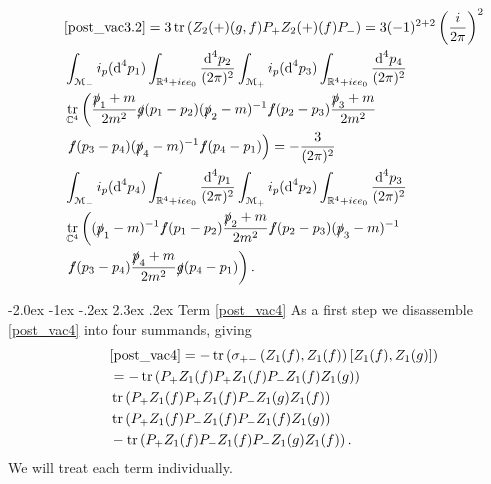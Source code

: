 \documentclass[oneside,reqno,12pt]{amsart}
\makeatletter
\DeclareMathOperator{\tr}{tr}
\renewcommand\section{\@startsection {section}{1}{\z@}%
                                   {-2.0ex \@plus -1ex \@minus -.2ex}%
                                   {2.3ex \@plus.2ex}%
                                   {\normalfont\Large\bfseries}}
\makeatother
\begin{document}
\begin{align*}
&\eqref{post_vac3.2}=3 \tr\left(Z_{2}(+)(g,f) P_+ Z_{2}(+)(f) P_-\right)
=3(-1)^{2+2}\left(\frac{i}{2\pi}\right)^2\\
&  \int_{\mathcal{M}_-}  i_p(\text{d}^4p_{1})
\int_{\mathbb{R}^4+i \epsilon e_0}\frac{\text{d}^4p_2}{(2\pi)^{2}} 
\int_{\mathcal{M}_+}  i_p(\text{d}^4p_{3})
\int_{\mathbb{R}^4+i\epsilon e_0}\frac{\text{d}^4p_4}{(2\pi)^{2}}\\\tag*{}
&\tr_{\mathbb{C}^4}\left(\frac{\slashed{p}_1+m}{2m^2}  \slashed{g}(p_{1}-p_2)  (\slashed{p}_2-m)^{-1}  
\slashed{f}(p_{2}-p_{3})
  \frac{\slashed{p}_{3}+m}{2m^2} \right.\\
&\left.\slashed{f}(p_{3}-p_4)  (\slashed{p}_4-m)^{-1}  
\slashed{f}(p_{4}-p_{1})\right)
=-\frac{3}{(2\pi)^2}\\
&  \int_{\mathcal{M}_-}  i_p(\text{d}^4p_{4})
\int_{\mathbb{R}^4+i \epsilon e_0}\frac{\text{d}^4p_1}{(2\pi)^{2}} 
\int_{\mathcal{M}_+}  i_p(\text{d}^4p_{2})
\int_{\mathbb{R}^4+i\epsilon e_0}\frac{\text{d}^4p_3}{(2\pi)^{2}}\\\tag*{}
&\tr_{\mathbb{C}^4}
\left( (\slashed{p}_1-m)^{-1}  \slashed{f}(p_{1}-p_{2})
  \frac{\slashed{p}_{2}+m}{2m^2} \slashed{f}(p_{2}-p_3)  (\slashed{p}_3-m)^{-1} \right.\\
&\left. \slashed{f}(p_{3}-p_{4})\frac{\slashed{p}_4+m}{2m^2}
 \slashed{g}(p_{4}-p_1)  \right)
.\end{align*}

\section{Term \eqref{post_vac4}}
As a first step we disassemble \eqref{post_vac4} into four summands, giving
\begin{align}\tag*{}
&\eqref{post_vac4}=- \tr\left( \sigma_{+-}\left(Z_1(f),Z_1(f)\right) \left[Z_1(f),Z_1(g)\right] \right)\\\label{post_vac4.1}
&=-\tr\left(P_+ Z_1(f) P_+Z_1(f)P_- Z_1(f) Z_1(g) \right)\\\label{post_vac4.2}
&\tr\left(P_+ Z_1(f) P_+Z_1(f)P_- Z_1(g) Z_1(f) \right)\\\label{post_vac4.3}
&\tr\left(P_+ Z_1(f) P_- Z_1(f)P_- Z_1(f) Z_1(g) \right)\\\label{post_vac4.4}
&-\tr\left(P_+ Z_1(f) P_- Z_1(f)P_- Z_1(g) Z_1(f) \right)
.\end{align}
We will treat each term individually.
\end{document}
